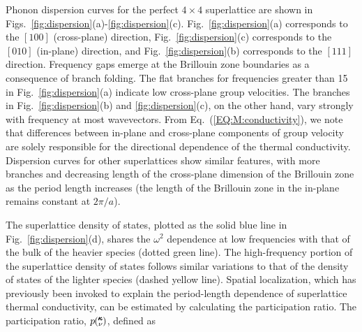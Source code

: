 \documentclass[aps,prb,preprint,preprintnumbers,amsmath,amssymb,floatfix,superscriptaddress]{revtex4}
\newcommand{\kv}{\mspace{-4.0mu}\left(\mspace{-8.0mu}
\begin{smallmatrix}&\pmb{\kappa} \\&\nu\end{smallmatrix}
\mspace{-3.0mu}\right)}
\begin{document}
Phonon dispersion curves for the perfect $4\times4$ superlattice are shown in Figs.~\ref{fig:dispersion}(a)-\ref{fig:dispersion}(c). Fig.~\ref{fig:dispersion}(a) corresponds to the $[1 0 0]$ (cross-plane) direction, Fig.~\ref{fig:dispersion}(c) corresponds to the $[0 1 0]$ (in-plane) direction, and Fig.~\ref{fig:dispersion}(b) corresponds to the $[1 1 1]$ direction. Frequency gaps emerge at the Brillouin zone boundaries as a consequence of branch folding.\cite{PhysRevB.38.1427,PhysRevB.60.2627} The flat branches for frequencies greater than 15 in Fig.~\ref{fig:dispersion}(a) indicate low cross-plane group velocities. The branches in Fig.~\ref{fig:dispersion}(b) and \ref{fig:dispersion}(c), on the other hand, vary strongly with frequency at most wavevectors. From Eq.~(\ref{EQ:M:conductivity}), we note that differences between in-plane and cross-plane components of group velocity are solely responsible for the directional dependence of the thermal conductivity.  Dispersion curves for other superlattices show similar features, with more branches and decreasing length of the cross-plane dimension of the Brillouin zone as the period length increases (the length of the Brillouin zone in the in-plane remains constant at $2\pi/a$).
\renewcommand{\topfraction}{0.7}
\begin{figure*}%
\begin{center}
\renewcommand{\figure}{Fig.}
\caption{(a),(b),(c) Dispersion, (d) density of states and (e) inverse participation ratio for a $4\times4$ superlattice. Labeled gray squares represent select modes for Fig.~\ref{fig:sed}.}%
\label{fig:dispersion}
\end{center}
\end{figure*}
The superlattice density of states, plotted as the solid blue line in Fig.~\ref{fig:dispersion}(d), shares the $\omega^2$ dependence at low frequencies with that of the bulk of the heavier species (dotted green line). The high-frequency portion of the superlattice density of states follows similar variations to that of the density of states of the lighter species (dashed yellow line). Spatial localization, which has previously been invoked to explain the period-length dependence of superlattice thermal conductivity, \cite{PhysRevB.61.3091} can be estimated by calculating the participation ratio. The participation ratio, $p\kv$, defined as\cite{PhysRevB.70.235214}
\end{document}

